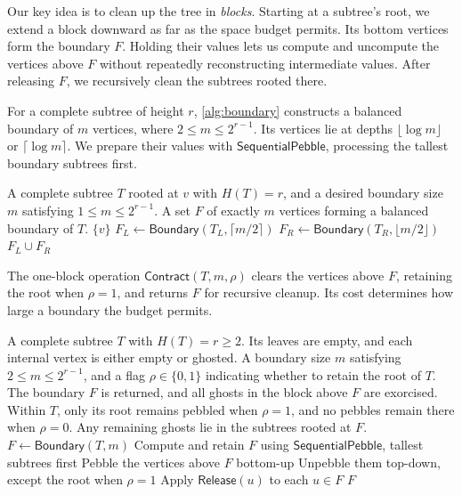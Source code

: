\documentclass[11pt]{article}
\theoremstyle{definition}
\theoremstyle{remark}
\newcommand{\Fast}{\mathsf{SequentialPebble}}
\newcommand{\Release}{\mathsf{Release}}
\newcommand{\Contract}{\mathsf{Contract}}
\begin{document}
Our key idea is to clean up the tree in \emph{blocks}. Starting at a subtree's root, we extend a block downward as far as the space budget permits. Its bottom vertices form the boundary $F$. Holding their values lets us compute and uncompute the vertices above $F$ without repeatedly reconstructing intermediate values. After releasing $F$, we recursively clean the subtrees rooted there.

For a complete subtree of height $r$, \cref{alg:boundary} constructs a balanced boundary of $m$ vertices, where $2\le m\le2^{r-1}$. Its vertices lie at depths $\lfloor\log m\rfloor$ or $\lceil\log m\rceil$. We prepare their values with $\Fast$, processing the tallest boundary subtrees first.

\begin{algorithm}[H]
\caption{Constructing a balanced boundary $\mathsf{Boundary}(T,m)$}
\label{alg:boundary}
\begin{algorithmic}[1]
\Require A complete subtree $T$ rooted at $v$ with $H(T)=r$, and a desired boundary size $m$ satisfying $1\le m\le2^{r-1}$.
\Ensure A set $F$ of exactly $m$ vertices forming a balanced boundary of $T$.
 \State \Return $\{v\}$
\EndIf
\State $F_L\gets\mathsf{Boundary}(T_L,\lceil m/2\rceil)$
\State $F_R\gets\mathsf{Boundary}(T_R,\lfloor m/2\rfloor)$
\State \Return $F_L\cup F_R$
\end{algorithmic}
\end{algorithm}

The one-block operation $\Contract(T,m,\rho)$ clears the vertices above $F$, retaining the root when $\rho=1$, and returns $F$ for recursive cleanup. Its cost determines how large a boundary the budget permits.


\begin{algorithm}[H]
\caption{One-block cleanup $\Contract(T,m,\rho)$}
\label{alg:block-contract}
\begin{algorithmic}[1]
\Require A complete subtree $T$ with $H(T)=r\ge2$. Its leaves are empty, and each internal vertex is either empty or ghosted.
\Require A boundary size $m$ satisfying $2\le m\le2^{r-1}$, and a flag $\rho\in\{0,1\}$ indicating whether to retain the root of $T$.
\Ensure The boundary $F$ is returned, and all ghosts in the block above $F$ are exorcised. Within $T$, only its root remains pebbled when $\rho=1$, and no pebbles remain there when $\rho=0$. Any remaining ghosts lie in the subtrees rooted at $F$.
\State $F\gets\mathsf{Boundary}(T,m)$
\State Compute and retain $F$ using $\Fast$, tallest subtrees first
\State Pebble the vertices above $F$ bottom-up
\State Unpebble them top-down, except the root when $\rho=1$
\State Apply $\Release(u)$ to each $u\in F$
\State \Return $F$
\end{algorithmic}
\end{algorithm}
\end{document}
